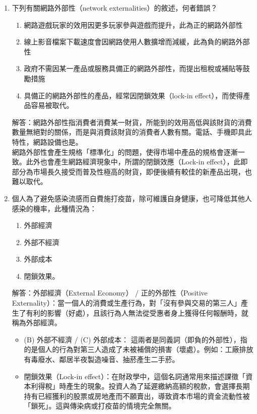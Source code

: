 \documentclass[12pt, a4paper]{article}
\begin{document}
\begin{enumerate}
    \item 下列有關網路外部性（network externalities）的敘述，何者錯誤？
    \begin{enumerate}[label=\Alph*.]
        \item 網路遊戲玩家的效用因更多玩家參與遊戲而提升，此為正的網路外部性
        \item 線上影音檔案下載速度會因網路使用人數擴增而減緩，此為負的網路外部性
        \item 政府不需因某一產品或服務具備正的網路外部性，而提出租稅或補貼等鼓勵措施
        \item 具備正的網路外部性的產品，經常因閉鎖效果（lock-in effect），而使得產品容易被取代。
    \end{enumerate}
    解答：網路外部性指消費者消費某一財貨，所能到的效用高低與該財貨的消費數量無絕對的關係，而是與消費該財貨的消費者人數有關。電話、手機即具此特性，網路設備也是。\\
    網路外部性會產生規格「標準化」的問題，使得市場中產品的規格會逐漸一致。此外也會產生網路經濟現象中，所謂的閉鎖效應（Lock-in effect），此即部分為市場長久接受而普及性極高的財貨，即便後續有較佳的新產品出現，也難以取代。


    \item 個人為了避免感染流感而自費施打疫苗，除可維護自身健康，也可降低其他人感染的機率，此種情況為：
    \begin{enumerate}[label=\Alph*.]
        \item 外部經濟
        \item 外部不經濟
        \item 外部成本
        \item 閉鎖效果。
    \end{enumerate}
    解答：外部經濟（External Economy） / 正的外部性（Positive Externality）：當一個人的消費或生產行為，對「沒有參與交易的第三人」產生了有利的影響（好處），且該行為人無法從受惠者身上獲得任何報酬時，就稱為外部經濟。
    \begin{itemize}
        \item 	(B) 外部不經濟 / (C) 外部成本： 這兩者是同義詞（即負的外部性），指的是個人的行為對第三人造成了未被補償的損害（壞處）。例如：工廠排放有毒廢水、鄰居半夜製造噪音、抽菸產生二手菸。
        \item 閉鎖效果（Lock-in effect）：在財政學中，這個名詞通常用來描述課徵「資本利得稅」時產生的現象。投資人為了延遲繳納高額的稅款，會選擇長期持有已經獲利的股票或房地產而不願賣出，導致資本市場的資金流動性被「鎖死」。這與傳染病或打疫苗的情境完全無關。
    \end{itemize}


\end{enumerate}
\end{document}
